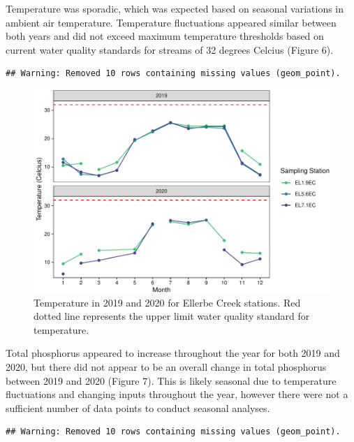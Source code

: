 \documentclass[
  12pt,
]{article}
\begin{document}
Temperature was sporadic, which was expected based on seasonal
variations in ambient air temperature. Temperature fluctuations appeared
similar between both years and did not exceed maximum temperature
thresholds based on current water quality standards for streams of 32
degrees Celcius (Figure 6).

\begin{verbatim}
## Warning: Removed 10 rows containing missing values (geom_point).
\end{verbatim}

\begin{figure}
\centering
\includegraphics{August_Lindborg_ENV872_Project_files/figure-latex/unnamed-chunk-8-1.pdf}
\caption{Temperature in 2019 and 2020 for Ellerbe Creek stations. Red
dotted line represents the upper limit water quality standard for
temperature.}
\end{figure}

Total phosphorus appeared to increase throughout the year for both 2019
and 2020, but there did not appear to be an overall change in total
phosphorus between 2019 and 2020 (Figure 7). This is likely seasonal due
to temperature fluctuations and changing inputs throughout the year,
however there were not a sufficient number of data points to conduct
seasonal analyses.

\begin{verbatim}
## Warning: Removed 10 rows containing missing values (geom_point).
\end{verbatim}
\end{document}
